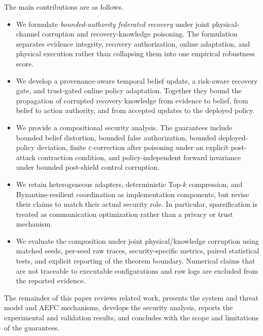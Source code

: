 The main contributions are as follows.
\begin{itemize}
    \item We formulate \emph{bounded-authority federated recovery} under joint physical-channel corruption and recovery-knowledge poisoning. The formulation separates evidence integrity, recovery authorization, online adaptation, and physical execution rather than collapsing them into one empirical robustness score.
    \item We develop a provenance-aware temporal belief update, a risk-aware recovery gate, and trust-gated online policy adaptation. Together they bound the propagation of corrupted recovery knowledge from evidence to belief, from belief to action authority, and from accepted updates to the deployed policy.
    \item We provide a compositional security analysis. The guarantees include bounded belief distortion, bounded false authorization, bounded deployed-policy deviation, finite $\varepsilon$-correction after poisoning under an explicit post-attack contraction condition, and policy-independent forward invariance under bounded post-shield control corruption.
    \item We retain heterogeneous adapters, deterministic Top-$k$ compression, and Byzantine-resilient coordination as implementation components, but revise their claims to match their actual security role. In particular, sparsification is treated as communication optimization rather than a privacy or trust mechanism.
    \item We evaluate the composition under joint physical/knowledge corruption using matched seeds, per-seed raw traces, security-specific metrics, paired statistical tests, and explicit reporting of the theorem boundary. Numerical claims that are not traceable to executable configurations and raw logs are excluded from the reported evidence.
\end{itemize}

The remainder of this paper reviews related work, presents the system and threat model and AEFC mechanisms, develops the security analysis, reports the experimental and validation results, and concludes with the scope and limitations of the guarantees.
